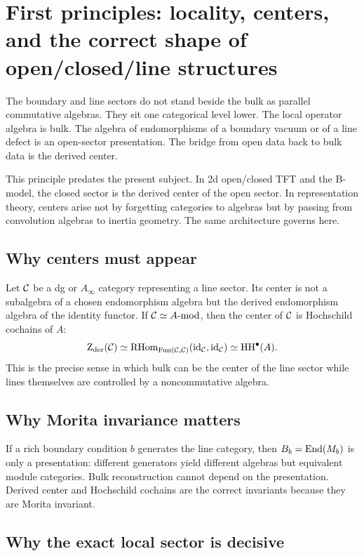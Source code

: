 \section{First principles: locality, centers, and the correct shape of open/closed/line structures}%

The boundary and line sectors do not stand beside the bulk as parallel commutative algebras. They sit one categorical level lower. The local operator algebra is bulk. The algebra of endomorphisms of a boundary vacuum or of a line defect is an open-sector presentation. The bridge from open data back to bulk data is the derived center.

This principle predates the present subject. In 2d open/closed TFT and the B-model, the closed sector is the derived center of the open sector. In representation theory, centers arise not by forgetting categories to algebras but by passing from convolution algebras to inertia geometry. The same architecture governs here.

\subsection{Why centers must appear}

Let $\mathcal C$ be a dg or $A_\infty$ category representing a line sector. Its center is not a subalgebra of a chosen endomorphism algebra but the derived endomorphism algebra of the identity functor. If $\mathcal C\simeq A\text{-mod}$, then the center of $\mathcal C$ is Hochschild cochains of $A$:
\[
\operatorname{Z}_{\mathrm{der}}(\mathcal C)\simeq \operatorname{RHom}_{\operatorname{Fun}(\mathcal C,\mathcal C)}(\operatorname{id}_{\mathcal C},\operatorname{id}_{\mathcal C})\simeq \operatorname{HH}^\bullet(A).
\]
This is the precise sense in which bulk can be the center of the line sector while lines themselves are controlled by a noncommutative algebra.

\subsection{Why Morita invariance matters}

If a rich boundary condition $b$ generates the line category, then $B_b=\operatorname{End}(M_b)$ is only a presentation: different generators yield different algebras but equivalent module categories. Bulk reconstruction cannot depend on the presentation. Derived center and Hochschild cochains are the correct invariants because they are Morita invariant.

\subsection{Why the exact local sector is decisive}

